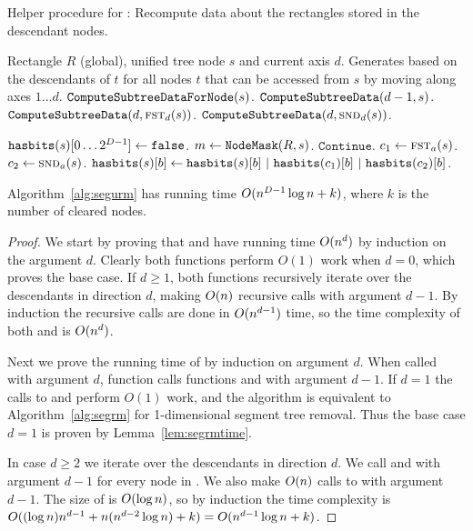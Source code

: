\documentclass[english,gradu]{tktltiki2018}
\begin{document}
\begin{algorithm}
\begin{algorithmic}
\caption{Helper procedure for \cleardt: Recompute data about the rectangles stored in the descendant nodes.}\label{alg:segurm:recomp}
\Require Rectangle $R$ (global), unified tree node $s$ and current axis $d$.
\Ensure Generates  based on the descendants of $t$ for all nodes $t$ that can be accessed from $s$ by moving along axes $1\dots d$.
		\State $\texttt{ComputeSubtreeDataForNode}(s)$.
		\State \Return
		\State \Return
	\EndIf
	\State $\texttt{ComputeSubtreeData}(d-1,s)$.
		\State $\texttt{ComputeSubtreeData}(d,\textsc{fst}_{d}(s))$.
		\State $\texttt{ComputeSubtreeData}(d,\textsc{snd}_{d}(s))$.
	\EndIf
\EndProcedure

	\State $\texttt{hasbits}(s)[0\dots 2^{D-1}]\gets\texttt{false}$.
	\State $m\gets\texttt{NodeMask}(R,s)$.
			\State $\texttt{Continue}$.
		\EndIf
		\State $c_1\gets\textsc{fst}_{a}(s)$.
		\State $c_2\gets\textsc{snd}_{a}(s)$.
				\State $\hasbits{s}{b}\gets \hasbits{s}{b}\ |\ \hasbits{c_1}{b}\ |\ \hasbits{c_2}{b}$.
			\EndIf
		\EndFor
	\EndFor
\EndProcedure
\end{algorithmic}
\end{algorithm}

\begin{lem}\label{lem:segurmtime}Algorithm~\ref{alg:segurm} has running time $O(n^{D-1}\log n + k)$, where $k$ is the number of cleared nodes.\end{lem}
\begin{proof}
We start by proving that \pdst and \recomp have running time $O(n^d)$ by induction on the argument $d$.
Clearly both functions perform $O(1)$ work when $d=0$, which proves the base case.
If $d\ge 1$, both functions recursively iterate over the descendants in direction $d$, making $O(n)$ recursive calls with argument $d-1$.
By induction the recursive calls are done in $O(n^{d-1})$ time, so the time complexity of both \pdst and \recomp is $O(n^d)$.

Next we prove the running time of \cleardt by induction on argument $d$.
When called with argument $d$, function \cleardt calls functions \pdst and \recomp with argument $d-1$.
If $d=1$ the calls to \pdst and \recomp perform $O(1)$ work, and the algorithm is equivalent to Algorithm~\ref{alg:segrm} for 1-dimensional segment tree removal.
Thus the base case $d=1$ is proven by Lemma~\ref{lem:segrmtime}.

In case $d\ge 2$ we iterate over the descendants in direction $d$.
We call \pdst and \recomp with argument $d-1$ for every node in .
We also make $O(n)$ calls to \cleardt with argument $d-1$.
The size of  is $O(\log n)$, so by induction the time complexity is $O((\log n)n^{d-1} + n(n^{d-2}\log n) + k)=O(n^{d-1}\log n + k)$.
\end{proof}
\end{document}
